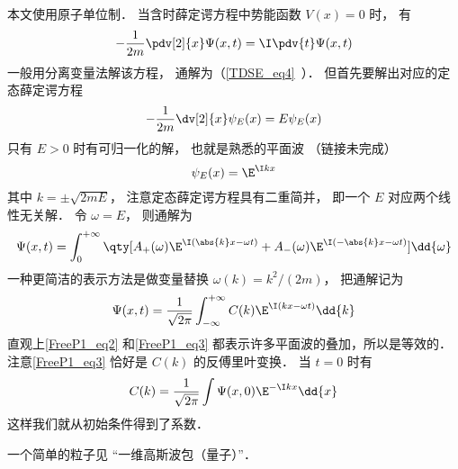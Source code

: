 
\begin{issues}
\issueDraft
\end{issues}


本文使用原子单位制． 当含时薛定谔方程中势能函数 $V(x) = 0$ 时， 有
\begin{equation}\label{FreeP1_eq1}
-\frac{1}{2m}\pdv[2]{x}\Psi(x,t) = \I \pdv{t} \Psi(x,t)
\end{equation}
一般用分离变量法解该方程， 通解为（\autoref{TDSE_eq4}~）． 但首先要解出对应的定态薛定谔方程
\begin{equation}
-\frac{1}{2m}\dv[2]{x}\psi_E(x) = E \psi_E(x)
\end{equation}
只有 $E > 0$ 时有可归一化的解， 也就是熟悉的平面波 （链接未完成）
\begin{equation}
\psi_E(x) = \E^{\I k x}
\end{equation}
其中 $k = \pm\sqrt{2mE}$， 注意定态薛定谔方程具有二重简并， 即一个 $E$ 对应两个线性无关解． 令 $\omega = E$， 则通解为
\begin{equation}\label{FreeP1_eq2}
\Psi(x,t) = \int_{0}^{+\infty} \qty[A_+(\omega) \E^{\I (\abs{k}x - \omega t)} + A_-(\omega) \E^{\I (-\abs{k}x - \omega t)}] \dd{\omega}
\end{equation}
一种更简洁的表示方法是做变量替换 $\omega(k) = k^2/(2m)$， 把通解记为
\begin{equation}\label{FreeP1_eq3}
\Psi(x,t) = \frac{1}{\sqrt{2\pi}} \int_{-\infty}^{+\infty} C(k) \E^{\I (k x - \omega t)} \dd{k}
\end{equation}
直观上\autoref{FreeP1_eq2} 和\autoref{FreeP1_eq3} 都表示许多平面波的叠加，所以是等效的． 注意\autoref{FreeP1_eq3} 恰好是 $C(k)$ 的反傅里叶变换． 当 $t = 0$ 时有
\begin{equation}
C(k) = \frac{1}{\sqrt{2\pi}} \int \Psi(x,0) \E^{-\I k x} \dd{x}
\end{equation}
这样我们就从初始条件得到了系数．

一个简单的粒子见 “一维高斯波包（量子）”．
